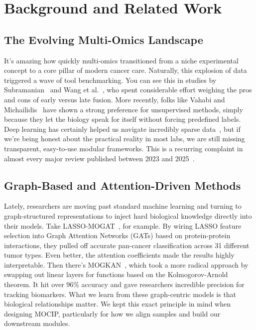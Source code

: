 \documentclass[runningheads]{llncs}
\begin{document}
\section{Background and Related Work}

\subsection{The Evolving Multi-Omics Landscape}
It's amazing how quickly multi-omics transitioned from a niche experimental concept to a core pillar of modern cancer care. Naturally, this explosion of data triggered a wave of tool benchmarking. You can see this in studies by Subramanian~\cite{subramanian2020} and Wang et al.~\cite{wang2021evaluation}, who spent considerable effort weighing the pros and cons of early versus late fusion. More recently, folks like Vahabi and Michailidis~\cite{vahabi2022unsupervised} have shown a strong preference for unsupervised methods, simply because they let the biology speak for itself without forcing predefined labels. Deep learning has certainly helped us navigate incredibly sparse data~\cite{kang2022roadmap}, but if we're being honest about the practical reality in most labs, we are still missing transparent, easy-to-use modular frameworks. This is a recurring complaint in almost every major review published between 2023 and 2025~\cite{wekesa2023review,abdelaziz2024multi,muneer2025review}.

\subsection{Graph-Based and Attention-Driven Methods}
Lately, researchers are moving past standard machine learning and turning to graph-structured representations to inject hard biological knowledge directly into their models. Take LASSO-MOGAT~\cite{alharbi2024lassomogat}, for example. By wiring LASSO feature selection into Graph Attention Networks (GATs) based on protein-protein interactions, they pulled off accurate pan-cancer classification across 31 different tumor types. Even better, the attention coefficients made the results highly interpretable. Then there's MOGKAN~\cite{alharbi2025mogkan}, which took a more radical approach by swapping out linear layers for functions based on the Kolmogorov-Arnold theorem. It hit over 96\% accuracy and gave researchers incredible precision for tracking biomarkers. What we learn from these graph-centric models is that biological relationships matter. We kept this exact principle in mind when designing MOCIP, particularly for how we align samples and build our downstream modules.
\end{document}
